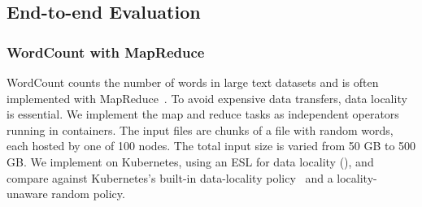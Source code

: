\subsection{End-to-end Evaluation}
\label{sec:eval:e2e}

\subsubsection{WordCount with MapReduce}
\label{eval:wordcount}
WordCount counts the number of words in large text datasets and is often implemented with MapReduce~\cite{mapreduce}. To avoid expensive data transfers, data locality is essential.
We implement the map and reduce tasks as independent operators running in containers.
The input files are chunks of a file with random words, each hosted by one of 100 nodes. The total input size is varied from 50 GB to 500 GB.
We implement \name{} on Kubernetes, using an ESL for data locality (), and compare against Kubernetes's built-in data-locality policy~\cite{kubernetes-doc} and a locality-unaware random policy.

